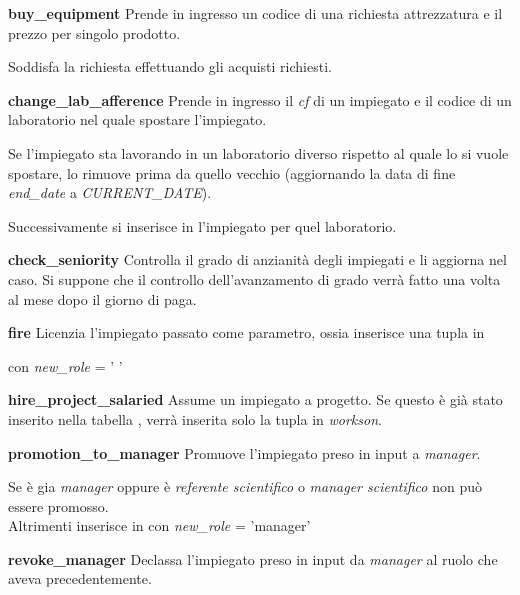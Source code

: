 \newpage
\noindent \textbf{buy\_equipment}\sskip
Prende in ingresso un codice di una richiesta attrezzatura e il prezzo per singolo prodotto.

Soddisfa la richiesta effettuando gli acquisti richiesti.
\bigskip

\newpage
\noindent \textbf{change\_lab\_afference}\sskip
Prende in ingresso il \textit{cf} di un impiegato e il codice di un laboratorio nel quale spostare l'impiegato.

Se l'impiegato sta lavorando in un laboratorio diverso rispetto al quale lo si vuole spostare, lo rimuove prima da quello vecchio (aggiornando la data di fine \textit{end\_date} a \textit{CURRENT\_DATE}).

Successivamente si inserisce in \textit{\worksat} l'impiegato per quel laboratorio.
\bigskip

\newpage
\noindent \textbf{check\_seniority}\sskip
Controlla il grado di anzianità degli impiegati e li aggiorna nel caso. Si suppone che il controllo dell'avanzamento di grado verrà fatto una volta al mese dopo il giorno di paga.
\bigskip

\noindent \textbf{fire}\sskip
Licenzia l'impiegato passato come parametro, ossia inserisce una tupla in

\textit{\careerlog} con \textit{new\_role} = ' '
\bigskip

\noindent \textbf{hire\_project\_salaried}\sskip
Assume un impiegato a progetto. Se questo è già stato inserito nella tabella \textit{\projectsalaried}, verrà inserita solo la tupla in \textit{workson}.
\bigskip

\newpage
\noindent \textbf{promotion\_to\_manager}\sskip
Promuove l'impiegato preso in input a \textit{manager}.

Se è gia \textit{manager} oppure è \textit{referente scientifico} o \textit{manager scientifico} non può essere promosso. \\
Altrimenti inserisce in \textit{\careerlog} con \textit{new\_role} = 'manager'
\bigskip

\newpage
\noindent \textbf{revoke\_manager}\sskip
Declassa l'impiegato preso in input da \textit{manager} al ruolo che aveva precedentemente.

